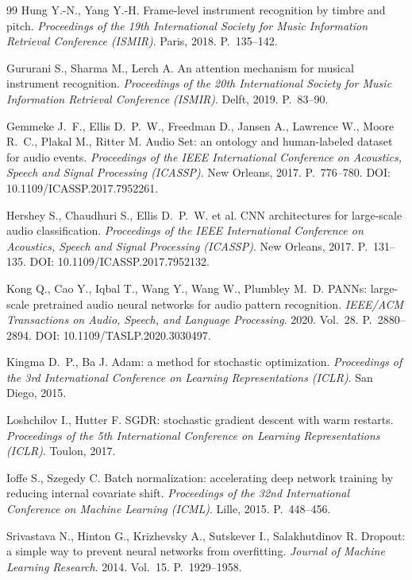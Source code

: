 \begin{thebibliography}{99}
Hung Y.-N., Yang Y.-H.
Frame-level instrument recognition by timbre and pitch.
\textit{Proceedings of the 19th International Society for Music Information Retrieval Conference (ISMIR)}.
Paris, 2018.
P.~135--142.

Gururani S., Sharma M., Lerch A.
An attention mechanism for musical instrument recognition.
\textit{Proceedings of the 20th International Society for Music Information Retrieval Conference (ISMIR)}.
Delft, 2019.
P.~83--90.

Gemmeke J.~F., Ellis D.~P.~W., Freedman D., Jansen A., Lawrence W., Moore R.~C., Plakal M., Ritter M.
Audio Set: an ontology and human-labeled dataset for audio events.
\textit{Proceedings of the IEEE International Conference on Acoustics, Speech and Signal Processing (ICASSP)}.
New Orleans, 2017.
P.~776--780.
DOI: 10.1109/ICASSP.2017.7952261.

Hershey S., Chaudhuri S., Ellis D.~P.~W. et al.
CNN architectures for large-scale audio classification.
\textit{Proceedings of the IEEE International Conference on Acoustics, Speech and Signal Processing (ICASSP)}.
New Orleans, 2017.
P.~131--135.
DOI: 10.1109/ICASSP.2017.7952132.

Kong Q., Cao Y., Iqbal T., Wang Y., Wang W., Plumbley M.~D.
PANNs: large-scale pretrained audio neural networks for audio pattern recognition.
\textit{IEEE/ACM Transactions on Audio, Speech, and Language Processing}.
2020.
Vol.~28.
P.~2880--2894.
DOI: 10.1109/TASLP.2020.3030497.

Kingma D.~P., Ba J.
Adam: a method for stochastic optimization.
\textit{Proceedings of the 3rd International Conference on Learning Representations (ICLR)}.
San Diego, 2015.

Loshchilov I., Hutter F.
SGDR: stochastic gradient descent with warm restarts.
\textit{Proceedings of the 5th International Conference on Learning Representations (ICLR)}.
Toulon, 2017.

Ioffe S., Szegedy C.
Batch normalization: accelerating deep network training by reducing internal covariate shift.
\textit{Proceedings of the 32nd International Conference on Machine Learning (ICML)}.
Lille, 2015.
P.~448--456.

Srivastava N., Hinton G., Krizhevsky A., Sutskever I., Salakhutdinov R.
Dropout: a simple way to prevent neural networks from overfitting.
\textit{Journal of Machine Learning Research}.
2014.
Vol.~15.
P.~1929--1958.


\end{thebibliography}
